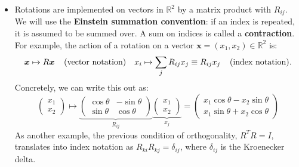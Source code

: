 \documentclass[12pt, oneside]{article}   	%
\theoremstyle{definition}
\begin{document}
\begin{itemize}
	
	\item Rotations are implemented on vectors in $\mathbb{R}^2$ by a matrix product with $R_{ij}$. We will use the \textbf{Einstein summation convention}: if an index is repeated, it is assumed to be summed over. A sum on indices is called a \textbf{contraction}. For example, the action of a rotation on a vector $\bm x = (x_1, x_2)\in \mathbb R^2$ is:
	\begin{align}
		\bm x \mapsto R\bm x\;\;\;\; (\textnormal{vector notation}) && x_i\mapsto \sum_j R_{ij} x_j \equiv R_{ij} x_j \;\;\;\; (\textnormal{index notation}).
	\end{align}
	Concretely, we can write this out as:
	\begin{equation}
		\begin{pmatrix} x_1 \\ x_2 \end{pmatrix} \mapsto \underbrace{\begin{pmatrix} \cos\theta & -\sin\theta \\ \sin\theta & \cos\theta \end{pmatrix}}_{R_{ij}} \underbrace{\begin{pmatrix} x_1 \\ x_2 \end{pmatrix} }_{x_j} = \begin{pmatrix} x_1 \cos\theta - x_2 \sin\theta \\ x_1\sin\theta + x_2 \cos\theta \end{pmatrix} 
	\end{equation}
	As another example, the previous condition of orthogonality, $R^T R = I$, translates into index notation as $R_{ki} R_{kj} = \delta_{ij}$, where $\delta_{ij}$ is the Kroenecker delta. 
	

\end{itemize}
\end{document}

